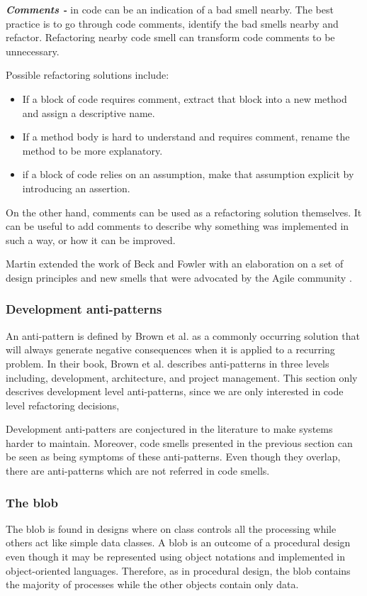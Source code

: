 \textit{\textbf{Comments -}} in code can be an indication of a bad smell nearby. The best practice is to go through code comments, identify the bad smells nearby and refactor. Refactoring nearby code smell can transform code comments to be unnecessary.

Possible refactoring solutions include:

\begin{itemize}
\item If a block of code requires comment, extract that block into a new method and assign a descriptive name.
\item If a method body is hard to understand and requires comment, rename the method to be more explanatory.
\item if a block of code relies on an assumption, make that assumption explicit by introducing an assertion.
\end{itemize}

On the other hand, comments can be used as a refactoring solution themselves. It can be useful to add comments to describe why something was implemented in such a way, or how it can be improved. 

Martin extended the work of Beck and Fowler with an elaboration on a set of design principles and new smells that were advocated by the Agile community \cite{martinAgile}.

\subsubsection{Development anti-patterns}
An anti-pattern is defined by Brown et al. \cite{brownAntiPatterns} as a commonly occurring solution that will always generate negative consequences when it is applied to a recurring problem. In their book, Brown et al. describes anti-patterns in three levels including, development, architecture, and project management. This section only descrives development level anti-patterns, since we are only interested in code level refactoring decisions, 

Development anti-patters are conjectured in the literature to make systems harder to maintain. Moreover, code smells presented in the previous section can be seen as being symptoms of these anti-patterns. Even though they overlap, there are anti-patterns which are not referred in code smells.  

\subsubsection*{The blob}
The blob is found in designs where on class controls all the processing while others act like simple data classes. A blob is an outcome of a procedural design even though it may be represented using object notations and implemented in object-oriented languages. Therefore, as in procedural design, the blob contains the majority of processes while the other objects contain only data. 

